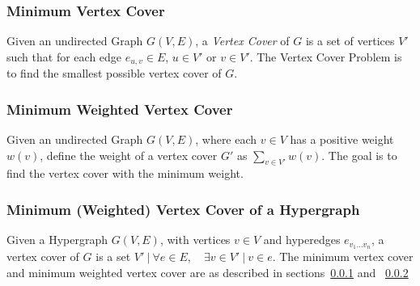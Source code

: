 \subsubsection{Minimum Vertex Cover}
\label{sub:mvc}
Given an undirected Graph $G(V,E)$, a {\em Vertex Cover} of $G$ is a set of vertices $V'$ such that for each edge $e_{u,v} \in E$, $u \in V'$ or $v \in V'$. The Vertex Cover Problem is to find the smallest possible vertex cover of $G$.

\subsubsection{Minimum Weighted Vertex Cover}
\label{sub:mwvc}
Given an undirected Graph $G(V,E)$, where each $v \in V$ has a positive weight $w(v)$, define the weight of a vertex cover $G'$ as $\sum_{v \in V'} w(v)$. The goal is to find the vertex cover with the minimum weight.

\subsubsection{Minimum (Weighted) Vertex Cover of a Hypergraph}

Given a Hypergraph $G(V,E)$, with vertices $v \in V$ and hyperedges $e_{v_1...v_n}$, a vertex cover of $G$ is a set $V'\: | \: \forall e \in E,\quad \exists v \in V'\: |\: v \in e$. The minimum vertex cover and minimum weighted vertex cover are as described in sections~\ref{sub:mvc} and ~\ref{sub:mwvc}